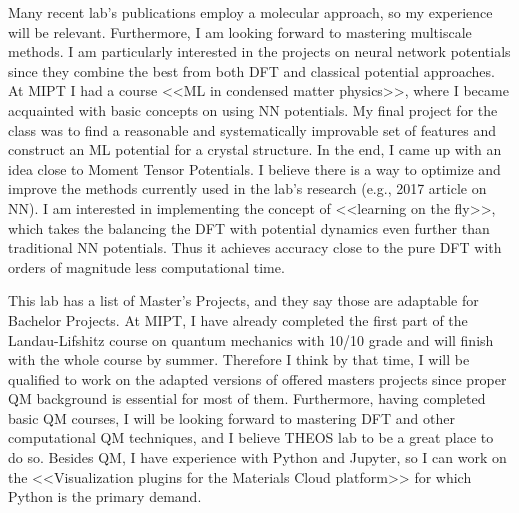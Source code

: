 \documentclass[12pt, a4paper]{awesome-cv}
\begin{document}
\begin{cvletter}
Many recent lab's publications employ a molecular approach, so my experience will be relevant. Furthermore, I am looking forward to mastering multiscale methods. I am particularly interested in the projects on neural network potentials since they combine the best from both DFT and classical potential approaches. At MIPT I had a course <<ML in condensed matter physics>>, where I became acquainted with basic concepts on using NN potentials. My final project for the class was to find a reasonable and systematically improvable set of features and construct an ML potential for a crystal structure. In the end, I came up with an idea close to Moment Tensor Potentials. I believe there is a way to optimize and improve the methods currently used in the lab's research (e.g., 2017 article on NN). I am interested in implementing the concept of <<learning on the fly>>, which takes the balancing the DFT with potential dynamics even further than traditional NN potentials. Thus it achieves accuracy close to the pure DFT with orders of magnitude less computational time.

This lab has a list of Master's Projects, and they say those are adaptable for Bachelor Projects. At MIPT, I have already completed the first part of the Landau-Lifshitz course on quantum mechanics with 10/10 grade and will finish with the whole course by summer. Therefore I think by that time, I will be qualified to work on the adapted versions of offered masters projects since proper QM background is essential for most of them. Furthermore, having completed basic QM courses, I will be looking forward to mastering DFT and other computational QM techniques, and I believe THEOS lab to be a great place to do so. Besides QM, I have experience with Python and Jupyter, so I can work on the <<Visualization plugins for the Materials Cloud platform>> for which Python is the primary demand.


\end{cvletter}
\end{document}
